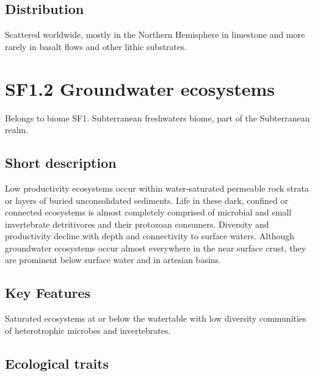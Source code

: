 \documentclass[
  letterpaper,
  DIV=11,
  numbers=noendperiod]{scrartcl}
\begin{document}
\subsection{Distribution}\label{distribution-62}

Scattered worldwide, mostly in the Northern Hemisphere in limestone and
more rarely in basalt flows and other lithic substrates.

\section{SF1.2 Groundwater
ecosystems}\label{sf1.2-groundwater-ecosystems}

Belongs to biome SF1. Subterranean freshwaters biome, part of the
Subterranean realm.

\subsection{Short description}\label{short-description-63}

Low productivity ecosystems occur within water-saturated permeable rock
strata or layers of buried unconsolidated sediments. Life in these dark,
confined or connected ecosystems is almost completely comprised of
microbial and small invertebrate detritivores and their protozoan
consumers. Diversity and productivity decline with depth and
connectivity to surface waters. Although groundwater ecosystems occur
almost everywhere in the near surface crust, they are prominent below
surface water and in artesian basins.

\subsection{Key Features}\label{key-features-63}

Saturated ecosystems at or below the watertable with low diversity
communities of heterotrophic microbes and invertebrates.

\subsection{Ecological traits}\label{ecological-traits-63}
\end{document}
